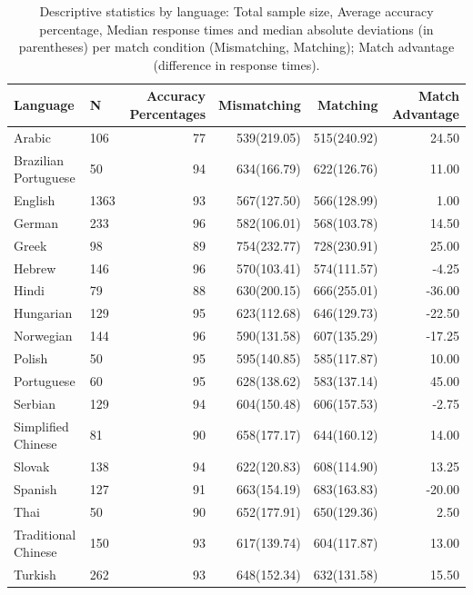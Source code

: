 \documentclass[
  man,floatsintext]{apa6}
\begin{document}
\begin{table}

\caption{\label{tab:summary-languages}Descriptive statistics by language: Total sample size, Average accuracy percentage, Median response times and median absolute deviations (in parentheses) per match condition (Mismatching, Matching); Match advantage (difference in response times).}
\centering
\begin{tabular}[t]{llrrrr}
\toprule
Language & N & Accuracy Percentages & Mismatching & Matching & Match Advantage\\
\midrule
Arabic & 106 & 77 & 539(219.05) & 515(240.92) & 24.50\\
Brazilian Portuguese & 50 & 94 & 634(166.79) & 622(126.76) & 11.00\\
English & 1363 & 93 & 567(127.50) & 566(128.99) & 1.00\\
German & 233 & 96 & 582(106.01) & 568(103.78) & 14.50\\
Greek & 98 & 89 & 754(232.77) & 728(230.91) & 25.00\\
\addlinespace
Hebrew & 146 & 96 & 570(103.41) & 574(111.57) & -4.25\\
Hindi & 79 & 88 & 630(200.15) & 666(255.01) & -36.00\\
Hungarian & 129 & 95 & 623(112.68) & 646(129.73) & -22.50\\
Norwegian & 144 & 96 & 590(131.58) & 607(135.29) & -17.25\\
Polish & 50 & 95 & 595(140.85) & 585(117.87) & 10.00\\
\addlinespace
Portuguese & 60 & 95 & 628(138.62) & 583(137.14) & 45.00\\
Serbian & 129 & 94 & 604(150.48) & 606(157.53) & -2.75\\
Simplified Chinese & 81 & 90 & 658(177.17) & 644(160.12) & 14.00\\
Slovak & 138 & 94 & 622(120.83) & 608(114.90) & 13.25\\
Spanish & 127 & 91 & 663(154.19) & 683(163.83) & -20.00\\
\addlinespace
Thai & 50 & 90 & 652(177.91) & 650(129.36) & 2.50\\
Traditional Chinese & 150 & 93 & 617(139.74) & 604(117.87) & 13.00\\
Turkish & 262 & 93 & 648(152.34) & 632(131.58) & 15.50\\
\bottomrule
\end{tabular}
\end{table}
\end{document}
